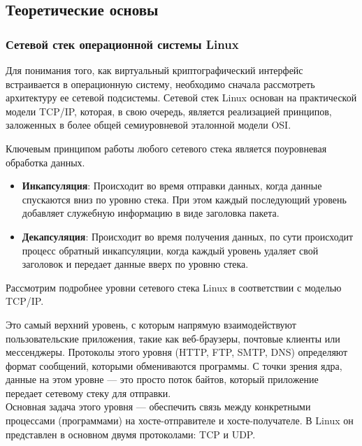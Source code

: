 

\subsection{Теоретические основы}

\subsubsection{Сетевой стек операционной системы Linux}
Для понимания того, как виртуальный криптографический интерфейс встраивается в операционную систему, необходимо сначала рассмотреть архитектуру ее сетевой подсистемы.
Сетевой стек Linux основан на практической модели TCP/IP, которая, в свою очередь, является реализацией принципов, заложенных в более общей семиуровневой эталонной модели OSI. \\


Ключевым принципом работы любого сетевого стека является поуровневая обработка данных.

\begin{itemize}
    \item \textbf{Инкапсуляция}: Происходит во время отправки данных, когда данные спускаются вниз по уровню стека. При этом каждый последующий уровень добавляет служебную информацию в виде заголовка пакета.
    \item \textbf{Декапсуляция}: Происходит во время получения данных, по сути происходит процесс обратный инкапсуляции, когда каждый уровень удаляет свой заголовок и передает данные вверх по уровню стека.
\end{itemize}



Рассмотрим подробнее уровни сетевого стека Linux в соответствии с моделью TCP/IP.


Это самый верхний уровень, с которым напрямую взаимодействуют пользовательские приложения, такие как веб-браузеры, почтовые клиенты или мессенджеры.
Протоколы этого уровня (HTTP, FTP, SMTP, DNS) определяют формат сообщений, которыми обмениваются программы.
С точки зрения ядра, данные на этом уровне — это просто поток байтов, который приложение передает сетевому стеку для отправки. \\

Основная задача этого уровня — обеспечить связь между конкретными процессами (программами) на хосте-отправителе и хосте-получателе.
В Linux он представлен в основном двумя протоколами: TCP и UDP.\\

